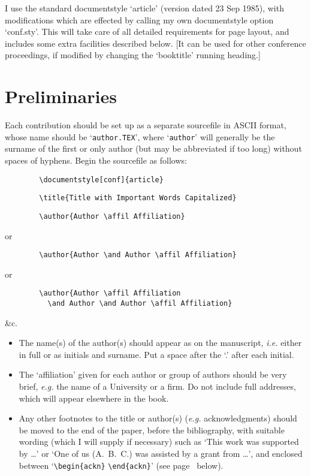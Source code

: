 I use the standard documentstyle `article' (version dated 23 Sep 1985),
with modifications which are effected by calling my own documentstyle
option `conf.sty'.  This will take care of all detailed requirements for
page layout, and includes some extra facilities described below.  [It can
be used for other conference proceedings, if modified by changing the
`booktitle' running heading.]
 
\section{Preliminaries}\label{s3}
 
Each contribution should be set up as a separate sourcefile in ASCII
format, whose name should be `\verb!author.TEX!', where `\verb!author!'
will generally be the surname of the first or only author (but may be
abbreviated if too long) without spaces of hyphens.  Begin the sourcefile
as follows:
 
\begin{verbatim}
        \documentstyle[conf]{article}
\end{verbatim}
 
\begin{verbatim}
        \title{Title with Important Words Capitalized}
\end{verbatim}
 
\begin{verbatim}
        \author{Author \affil Affiliation}
\end{verbatim}
or
\begin{verbatim}
        \author{Author \and Author \affil Affiliation}
\end{verbatim}
or
\begin{verbatim}
        \author{Author \affil Affiliation
          \and Author \and Author \affil Affiliation}
\end{verbatim}
\&c.
 
\begin{itemize}
 
\item The name(s) of the author(s) should appear as on the manuscript,
{\em i.e.} either in full or as initials and surname.  Put a space after
the `.' after each initial.
 
\item The `affiliation' given for each author or group of authors should
be very brief, {\em e.g.} the name of a University or a firm.  Do not
include full addresses, which will appear elsewhere in the book.
 
\item Any other footnotes to the title or author(s) ({\em e.g.}
acknowledgments) should be moved to the end of the paper, before the
bibliography, with suitable wording (which I will supply if necessary) such
as `This work was supported by \ldots' or `One of us (A.~B.~C.) was
assisted by a grant from \ldots', and enclosed between `\verb!\begin{ackn}!
\verb!\end{ackn}!' (see page~\pageref{ack} below).
 
\end{itemize}
 
